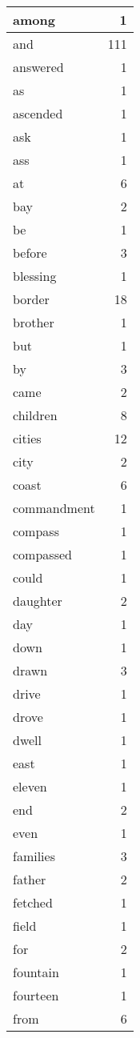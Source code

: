 \begin{center}
\begin{longtable}{l|r}
among & 1\\ \hline 
and & 111\\ \hline 
answered & 1\\ \hline 
as & 1\\ \hline 
ascended & 1\\ \hline 
ask & 1\\ \hline 
ass & 1\\ \hline 
at & 6\\ \hline 
bay & 2\\ \hline 
be & 1\\ \hline 
before & 3\\ \hline 
blessing & 1\\ \hline 
border & 18\\ \hline 
brother & 1\\ \hline 
but & 1\\ \hline 
by & 3\\ \hline 
came & 2\\ \hline 
children & 8\\ \hline 
cities & 12\\ \hline 
city & 2\\ \hline 
coast & 6\\ \hline 
commandment & 1\\ \hline 
compass & 1\\ \hline 
compassed & 1\\ \hline 
could & 1\\ \hline 
daughter & 2\\ \hline 
day & 1\\ \hline 
down & 1\\ \hline 
drawn & 3\\ \hline 
drive & 1\\ \hline 
drove & 1\\ \hline 
dwell & 1\\ \hline 
east & 1\\ \hline 
eleven & 1\\ \hline 
end & 2\\ \hline 
even & 1\\ \hline 
families & 3\\ \hline 
father & 2\\ \hline 
fetched & 1\\ \hline 
field & 1\\ \hline 
for & 2\\ \hline 
fountain & 1\\ \hline 
fourteen & 1\\ \hline 
from & 6\\ \hline 

\end{longtable}
\end{center}
